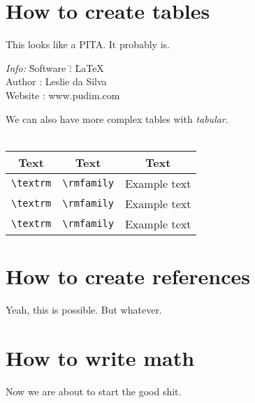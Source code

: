\documentclass[a4paper, 12pt]{book}
\newcommand{\head}[1]{\textnormal{\textbf{#1}}}
\begin{document}
\section{How to create tables}
This looks like a PITA. It probably is.
\begin{tabbing}
    \emph{Info:} \= Software \= :  \= \LaTeX \\
    \> Author \> : \> Leslie da Silva \\
    \> Website \> : \> www.pudim.com
\end{tabbing}
We can also have more complex tables with \textit{tabular}.\\\\
\begin{tabular}{|c|c|c|} %
    \hline
    \head{Text} & \head{Text} & \head{Text}\\
    \hline
    \verb|\textrm| & \verb|\rmfamily| & \rmfamily Example text\\
    \verb|\textrm| & \verb|\rmfamily| & \rmfamily Example text\\
    \verb|\textrm| & \verb|\rmfamily| & \rmfamily Example text\\
    \hline
\end{tabular}
\newpage
\section{How to create references}
Yeah, this is possible. But whatever.
\newpage
\section{How to write math}
Now we are about to start the good shit.
\end{document}
